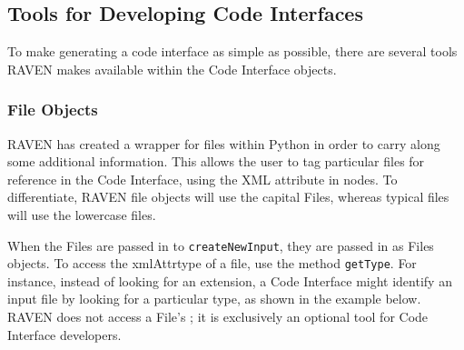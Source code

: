 \subsection{Tools for Developing Code Interfaces}
To make generating a code interface as simple as possible, there are several tools RAVEN makes available within the Code Interface objects.

\subsubsection{File Objects}
RAVEN has created a wrapper for files within Python in order to carry along some additional information.  This allows the user to tag particular files for reference in the Code Interface, using the  XML attribute in  nodes.  To differentiate, RAVEN file objects will use the capital Files, whereas typical files will use the lowercase files.

When the Files are passed in to \texttt{createNewInput}, they are passed in as Files objects. To access the xmlAttr{type} of a file, use the method \texttt{getType}.  For instance, instead of looking for an extension, a Code Interface might identify an input file by looking for a particular type, as shown in the example below. \nb RAVEN does not access a File's ; it is exclusively an optional tool for Code Interface developers.

